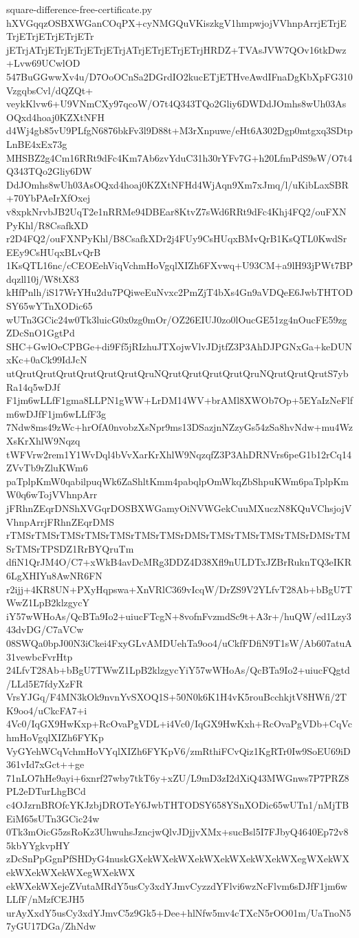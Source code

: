 \documentclass[11pt]{article}
\theoremstyle{definition}
\theoremstyle{remark}
\begin{document}
\begin{filecontents*}[overwrite]{square-difference-free-certificate.py}
hXVGqqzOSBXWGanCOqPX+cyNMGQuVKiszkgV1hmpwjojVVhnpArrjETrjETrjETrjETrjETrjETr
jETrjATrjETrjETrjETrjETrjATrjETrjETrjETrjHRDZ+TVAsJVW7QOv16tkDwz+Lvw69UCwlOD
547BuGGwwXv4u/D7OoOCnSa2DGrdIO2kucETjETHveAwdIFnaDgKbXpFG310VzgqbsCvl/dQZQt+
veykKlvw6+U9VNmCXy97qcoW/O7t4Q343TQo2Gliy6DWDdJOmhs8wUh03AsOQxd4hoaj0KZXtNFH
d4Wj4gb85vU9PLfgN6876bkFv3l9D88t+M3rXnpuwe/eHt6A302Dgp0mtgxq3SDtpLnBE4xEx73g
MHSBZ2g4Cm16RRt9dFc4Km7Ab6zvYduC31h30rYFv7G+h20LfmPdS9sW/O7t4Q343TQo2Gliy6DW
DdJOmhs8wUh03AsOQxd4hoaj0KZXtNFHd4WjAqn9Xm7xJmq/l/uKibLaxSBR+70YbPAeIrXfOxej
v8xpkNrvbJB2UqT2e1nRRMe94DBEar8KtvZ7sWd6RRt9dFc4Khj4FQ2/ouFXNPyKhl/R8CsafkXD
r2D4FQ2/ouFXNPyKhl/B8CsafkXDr2j4FUy9CsHUqxBMvQrB1KsQTL0KwdSrEEy9CsHUqxBLvQrB
1KsQTL16nc/cCEOEehViqVchmHoVgqlXIZh6FXvwq+U93CM+a9lH93jPWt7BPdqzll10j/W8tX83
kHfPnlh/iS17WrYHu2du7PQiweEuNvxc2PmZjT4bXs4Gn9aVDQeE6JwbTHTODSY65wYTnXODic65
wUTn3GCic24w0Tk3luicG0x0zg0mOr/OZ26EIUJ0zo0lOucGE51zg4nOucFE59zgZDcSnO1GgtPd
SHC+GwlOeCPBGe+di9Ff5jRIzhuJTXojwVlvJDjtfZ3P3AhDJPGNxGa+keDUNxKc+0aCk99IdJcN
utQrutQrutQrutQrutQrutQrutQruNQrutQrutQrutQrutQruNQrutQrutQrutS7ybRa14q5wDJf
F1jm6wLLfF1gma8LLPN1gWW+LrDM14WV+brAMl8XWOb7Op+5EYaIzNeFlfm6wDJfF1jm6wLLfF3g
7Ndw8ms49zWc+hrOfA0nvobzXsNpr9ms13DSazjnNZzyGs54zSa8hvNdw+mu4WzXsKrXhlW9Nqzq
tWFVrw2rem1Y1WvDql4bVvXarKrXhlW9NqzqfZ3P3AhDRNVrs6peG1b12rCq14ZVvTb9rZluKWm6
paTplpKmW0qabilpuqWk6ZaShltKmm4pabqlpOmWkqZbShpuKWm6paTplpKmW0q6wTojVVhnpArr
jFRhnZEqrDNShXVGqrDOSBXWGamyOiNVWGekCuuMXuczN8KQuVChsjojVVhnpArrjFRhnZEqrDMS
rTMSrTMSrTMSrTMSrTMSrTMSrTMSrDMSrTMSrTMSrTMSrTMSrDMSrTMSrTMSrTPSDZ1RrBYQruTm
dfiN1QrJM4O/C7+xWkB4avDcMRg3DDZ4D38Xfl9nULDTxJZBrRuknTQ3eIKR6LgXHIYu8AwNR6FN
r2ijj+4KR8UN+PXyHqpswa+XnVRlC369vIcqW/DrZS9V2YLfvT28Ab+bBgU7TWwZ1LpB2klzgycY
iY57wWHoAs/QcBTa9Io2+uiucFTcgN+8vofnFvzmdSc9t+A3r+/huQW/ed1Lzy343dvDG/C7aVCw
08SWQa0bpJ00N3iCkei4FxyGLvAMDUehTa9oo4/uCkfFDfiN9T1sW/Ab607atuA31vewbcFvrHtp
24LfvT28Ab+bBgU7TWwZ1LpB2klzgycYiY57wWHoAs/QcBTa9Io2+uiucFQgtd/LLd5E7fdyXzFR
VrsYJGq/F4MN3kOk9nvnYvSXOQ1S+50N0k6K1H4vK5rouBcchkjtV8HWfi/2TK9oo4/uCkcFA7+i
4Vc0/IqGX9HwKxp+RcOvaPgVDL+i4Vc0/IqGX9HwKxh+RcOvaPgVDb+CqVchmHoVgqlXIZh6FYKp
VyGYehWCqVchmHoVYqlXIZh6FYKpV6/zmRthiFCvQiz1KgRTr0Iw9SoEU69iD361vId7xGct++ge
71nLO7hHe9ayi+6xnrf27wby7tkT6y+xZU/L9mD3zI2dXiQ43MWGnws7P7PRZ8PL2eDTurLhgBCd
c4OJzrnBROfcYKJzbjDROTeY6JwbTHTODSY658YSnXODic65wUTn1/nMjTBEiM65sUTn3GCic24w
0Tk3mOicG5zsRoKz3UhwuhsJzncjwQlvJDjjvXMx+sucBsl5I7FJbyQ4640Ep72v85kbYYgkvpHY
zDcSnPpGgnPfSHDyG4nuskGXekWXekWXekWXekWXekWXekWXegWXekWXekWXekWXekWXegWXekWX
ekWXekWXejeZVutaMRdY5usCy3xdYJmvCyzzdYFlvi6wzNcFlvm6sDJfF1jm6wLLfF/nMzfCEJH5
urAyXxdY5usCy3xdYJmvC5z9Gk5+Dee+hlNfw5mv4cTXcN5rOO01m/UaTnoN57yGU17DGa/ZhNdw

\end{filecontents*}
\end{document}

